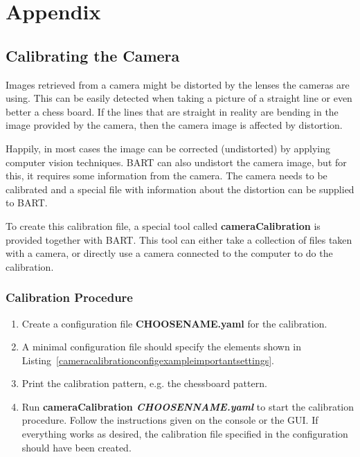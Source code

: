 \chapter{Appendix}

\section{Calibrating the Camera}

Images retrieved from a camera might be distorted by the lenses the cameras are using. This can be easily detected when taking a picture of a straight line or even better a chess board. If the lines that are straight in reality are bending in the image provided by the camera, then the camera image is affected by distortion. 

Happily, in most cases the image can be corrected (undistorted) by applying computer vision techniques. BART can also undistort the camera image, but for this, it requires some information from the camera. The camera needs to be calibrated and a special file with information about the distortion can be supplied to BART.

To create this calibration file, a special tool called {\bf cameraCalibration} is provided together with BART. This tool can either take a collection of files taken with a camera, or directly use a camera connected to the computer to do the calibration.

\subsection{Calibration Procedure}

\begin{enumerate}
	\item Create a configuration file {\bf CHOOSENAME.yaml} for the calibration.
	\item A minimal configuration file should specify the elements shown in Listing~\ref{cameracalibrationconfigexampleimportantsettings}.
	\item Print the calibration pattern, e.g. the chessboard pattern.
	\item Run {\bf cameraCalibration {\em CHOOSENNAME.yaml}} to start the calibration procedure. Follow the instructions given on the console or the GUI. If everything works as desired, the calibration file specified in the configuration should have been created.
\end{enumerate}


